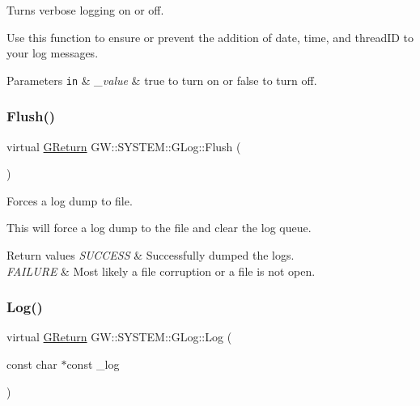 Turns verbose logging on or off. 

Use this function to ensure or prevent the addition of date, time, and thread\+ID to your log messages.


\begin{DoxyParams}[1]{Parameters}
\mbox{\tt in}  & {\em \+\_\+value} & true to turn on or false to turn off. \\
\hline
\end{DoxyParams}
\mbox{\label{classGW_1_1SYSTEM_1_1GLog_a07147c15ecb17caa1c83974b3c54f7d4}} 
\subsubsection{\texorpdfstring{Flush()}{Flush()}}
{\footnotesize\ttfamily virtual \mbox{\hyperlink{namespaceGW_a67a839e3df7ea8a5c5686613a7a3de21}{G\+Return}} G\+W\+::\+S\+Y\+S\+T\+E\+M\+::\+G\+Log\+::\+Flush (\begin{DoxyParamCaption}{ }\end{DoxyParamCaption})\hspace{0.3cm}{\ttfamily [pure virtual]}}



Forces a log dump to file. 

This will force a log dump to the file and clear the log queue.


\begin{DoxyRetVals}{Return values}
{\em S\+U\+C\+C\+E\+SS} & Successfully dumped the logs. \\
\hline
{\em F\+A\+I\+L\+U\+RE} & Most likely a file corruption or a file is not open. \\
\hline
\end{DoxyRetVals}
\mbox{\label{classGW_1_1SYSTEM_1_1GLog_a9e21e702d012065fe799b4c49f7ac670}} 
\subsubsection{\texorpdfstring{Log()}{Log()}}
{\footnotesize\ttfamily virtual \mbox{\hyperlink{namespaceGW_a67a839e3df7ea8a5c5686613a7a3de21}{G\+Return}} G\+W\+::\+S\+Y\+S\+T\+E\+M\+::\+G\+Log\+::\+Log (\begin{DoxyParamCaption}\item[{const char $\ast$const}]{\+\_\+log }\end{DoxyParamCaption})\hspace{0.3cm}{\ttfamily [pure virtual]}}



